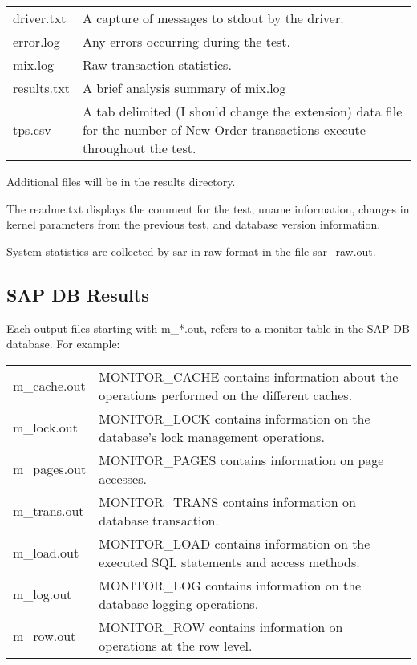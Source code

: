 \documentclass{article}
\begin{document}
\begin{tabular}[c]{ll}
driver.txt	&	A capture of messages to stdout by the driver. \\
error.log	&	Any errors occurring during the test. \\
mix.log		&	Raw transaction statistics. \\
results.txt	&	A brief analysis summary of mix.log \\
tps.csv		&	A tab delimited (I should change the extension) data
			file for the number of New-Order transactions execute
			throughout the test. \\
\end{tabular}

\noindent
Additional files will be in the results directory.

\noindent
The readme.txt displays the comment for the test, uname  information, changes
in kernel parameters from the previous test, and database version information.

\noindent
System statistics are collected by sar in raw format in the file sar\_raw.out.

\subsection{SAP DB Results}

Each output files starting with m\_*.out, refers to a monitor table in the
SAP DB database.  For example:

\begin{tabular}[c]{ll}
m\_cache.out	&	MONITOR\_CACHE contains information about the operations
			performed on the different caches. \\
m\_lock.out	&	MONITOR\_LOCK contains information on the database's
			lock management operations. \\
m\_pages.out	&	MONITOR\_PAGES contains information on page accesses. \\
m\_trans.out	&	MONITOR\_TRANS contains information on database
			transaction. \\
m\_load.out	&	MONITOR\_LOAD contains information on the executed SQL
			statements and access methods. \\
m\_log.out	&	MONITOR\_LOG contains information on the database
			logging operations. \\
m\_row.out	&	MONITOR\_ROW contains information on operations at the
			row level. \\
\end{tabular}
\end{document}
